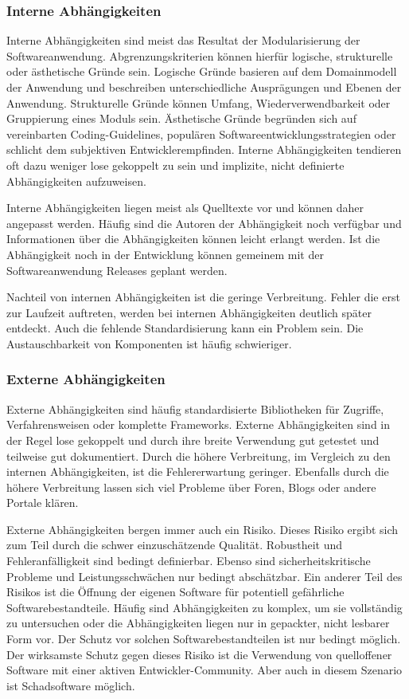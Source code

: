 \subsubsection{Interne Abhängigkeiten}

Interne Abhängigkeiten sind meist das Resultat der Modularisierung der Softwareanwendung. Abgrenzungskriterien können hierfür logische, strukturelle oder ästhetische Gründe sein. Logische Gründe basieren auf dem Domainmodell der Anwendung und beschreiben unterschiedliche Ausprägungen und Ebenen der Anwendung. Strukturelle Gründe können Umfang, Wiederverwendbarkeit oder Gruppierung eines Moduls sein. Ästhetische Gründe begründen sich auf vereinbarten Coding-Guidelines, populären Softwareentwicklungsstrategien oder schlicht dem subjektiven Entwicklerempfinden. Interne Abhängigkeiten tendieren oft dazu weniger lose gekoppelt zu sein und implizite, nicht definierte Abhängigkeiten aufzuweisen.

Interne Abhängigkeiten liegen meist als Quelltexte vor und können daher angepasst werden. Häufig sind die Autoren der Abhängigkeit noch verfügbar und Informationen über die Abhängigkeiten können leicht erlangt werden.
Ist die Abhängigkeit noch in der Entwicklung können gemeinem mit der Softwareanwendung Releases geplant werden. 

Nachteil von internen Abhängigkeiten ist die geringe Verbreitung. Fehler die erst zur Laufzeit auftreten, werden bei internen Abhängigkeiten deutlich später entdeckt. Auch die fehlende Standardisierung kann ein Problem sein. Die Austauschbarkeit von Komponenten ist häufig schwieriger.

\subsubsection{Externe Abhängigkeiten}

Externe Abhängigkeiten sind häufig standardisierte Bibliotheken für Zugriffe, Verfahrensweisen oder komplette Frameworks. Externe Abhängigkeiten sind in der Regel lose gekoppelt und durch ihre breite Verwendung gut getestet und teilweise gut dokumentiert. Durch die höhere Verbreitung, im Vergleich zu den internen Abhängigkeiten, ist die Fehlererwartung geringer. Ebenfalls durch die höhere Verbreitung lassen sich viel Probleme über Foren, Blogs oder andere Portale klären.

Externe Abhängigkeiten bergen immer auch ein Risiko. Dieses Risiko ergibt sich zum Teil durch die schwer einzuschätzende Qualität. Robustheit und Fehleranfälligkeit sind bedingt definierbar. Ebenso sind sicherheitskritische Probleme und Leistungsschwächen nur bedingt abschätzbar. Ein anderer Teil des Risikos ist die Öffnung der eigenen Software für potentiell gefährliche Softwarebestandteile. Häufig sind Abhängigkeiten zu komplex, um sie vollständig zu untersuchen oder die Abhängigkeiten liegen nur in gepackter, nicht lesbarer Form vor. Der Schutz vor solchen Softwarebestandteilen ist nur bedingt möglich. Der wirksamste Schutz gegen dieses Risiko ist die Verwendung von quelloffener Software mit einer aktiven Entwickler-Community. Aber auch in diesem Szenario ist Schadsoftware möglich.


